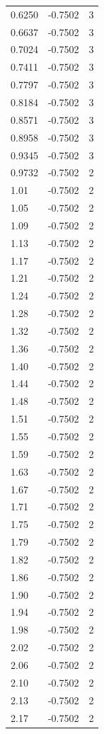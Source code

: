 \begin{longtable}{lrr}
  0.6250 & -0.7502 & 3 \\
  0.6637 & -0.7502 & 3 \\
  0.7024 & -0.7502 & 3 \\
  0.7411 & -0.7502 & 3 \\
  0.7797 & -0.7502 & 3 \\
  0.8184 & -0.7502 & 3 \\
  0.8571 & -0.7502 & 3 \\
  0.8958 & -0.7502 & 3 \\
  0.9345 & -0.7502 & 3 \\
  0.9732 & -0.7502 & 2 \\
  1.01 & -0.7502 & 2 \\
  1.05 & -0.7502 & 2 \\
  1.09 & -0.7502 & 2 \\
  1.13 & -0.7502 & 2 \\
  1.17 & -0.7502 & 2 \\
  1.21 & -0.7502 & 2 \\
  1.24 & -0.7502 & 2 \\
  1.28 & -0.7502 & 2 \\
  1.32 & -0.7502 & 2 \\
  1.36 & -0.7502 & 2 \\
  1.40 & -0.7502 & 2 \\
  1.44 & -0.7502 & 2 \\
  1.48 & -0.7502 & 2 \\
  1.51 & -0.7502 & 2 \\
  1.55 & -0.7502 & 2 \\
  1.59 & -0.7502 & 2 \\
  1.63 & -0.7502 & 2 \\
  1.67 & -0.7502 & 2 \\
  1.71 & -0.7502 & 2 \\
  1.75 & -0.7502 & 2 \\
  1.79 & -0.7502 & 2 \\
  1.82 & -0.7502 & 2 \\
  1.86 & -0.7502 & 2 \\
  1.90 & -0.7502 & 2 \\
  1.94 & -0.7502 & 2 \\
  1.98 & -0.7502 & 2 \\
  2.02 & -0.7502 & 2 \\
  2.06 & -0.7502 & 2 \\
  2.10 & -0.7502 & 2 \\
  2.13 & -0.7502 & 2 \\
  2.17 & -0.7502 & 2 \\

\end{longtable}

